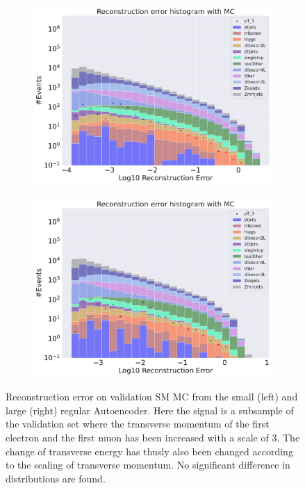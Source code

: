 \begin{figure}[H]
    \centering
    \begin{subfigure}{.45\textwidth}
        \includegraphics[width=\textwidth]{Figures/AE_testing/small/b_data_recon_big_rm3_feats_sig_pT_3.pdf}
        \caption{}
        \label{fig:ae_small_pt_3}
    \end{subfigure}
    \hfill 
    \begin{subfigure}{.45\textwidth}
        \includegraphics[width=\textwidth]{Figures/AE_testing/big/b_data_recon_big_rm3_feats_sig_pT_3.pdf}
        \caption{}
        \label{fig:ae_big_pt_3}
    \end{subfigure}
    \hfill 
    \caption[AE | Reconstruction error $p_T$ altering of 3]{Reconstruction error on validation SM MC from the small (left) and large (right) regular Autoencoder. Here the signal is a subsample of the validation 
    set where the transverse momentum of the first electron and the first muon has been increased with a scale of $3$. The change of transverse 
    energy has thusly also been changed according to the scaling of transverse momentum. No significant difference in distributions are found.  }
    \label{fig:ae_big_small_pt_3}
\end{figure}

